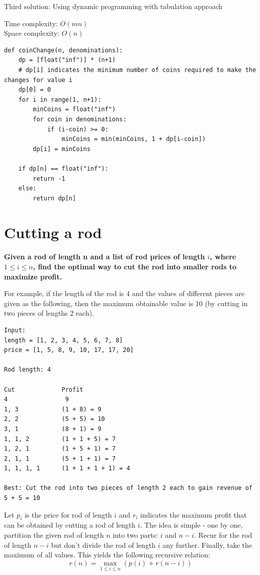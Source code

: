 \documentclass[a4paper,11pt]{book}
\begin{document}
\noindent Third solution: Using dynamic programming with tabulation approach

\noindent Time complexity: $O(mn)$\\
\noindent  Space complexity: $O(n)$

\begin{lstlisting}
def coinChange(n, denominations):
    dp = [float("inf")] * (n+1) 
    # dp[i] indicates the minimum number of coins required to make the changes for value i
    dp[0] = 0
    for i in range(1, n+1):
        minCoins = float("inf")
        for coin in denominations:
            if (i-coin) >= 0:
                minCoins = min(minCoins, 1 + dp[i-coin])
        dp[i] = minCoins
    
    if dp[n] == float("inf"):
        return -1
    else:
        return dp[n]
\end{lstlisting}

\newpage
\section{Cutting a rod}

\textbf{Given a rod of length n and a list of rod prices of length $i$, where $1 \leq i \leq n$, find the optimal way to cut the rod into smaller rods to maximize profit.}

\vspace{5mm}

\noindent For example, if the length of the rod is 4 and the values of different pieces are given as the following, then the maximum obtainable value is 10 (by cutting in two pieces of lengths 2 each).

\begin{lstlisting}
Input:
length = [1, 2, 3, 4, 5, 6, 7, 8]
price = [1, 5, 8, 9, 10, 17, 17, 20]
 
Rod length: 4

Cut             Profit
4                9
1, 3            (1 + 8) = 9
2, 2            (5 + 5) = 10
3, 1            (8 + 1) = 9
1, 1, 2         (1 + 1 + 5) = 7
1, 2, 1         (1 + 5 + 1) = 7
2, 1, 1         (5 + 1 + 1) = 7
1, 1, 1, 1      (1 + 1 + 1 + 1) = 4

Best: Cut the rod into two pieces of length 2 each to gain revenue of 5 + 5 = 10
\end{lstlisting}

\noindent Let $p_i$ is the price for rod of length $i$ and $r_i$ indicates the maximum profit that can be obtained by cutting a rod of length $i$. The idea is simple - one by one, partition the given rod of length $n$ into two parts: $i$ and $n-i$. Recur for the rod of length $n-i$ but don't divide the rod of length $i$ any further. Finally, take the maximum of all values. This yields the following recursive relation:
$$r(n) = \max_{1 \leq i \leq n}\left(p(i) + r(n-i)\right)$$
\end{document}
